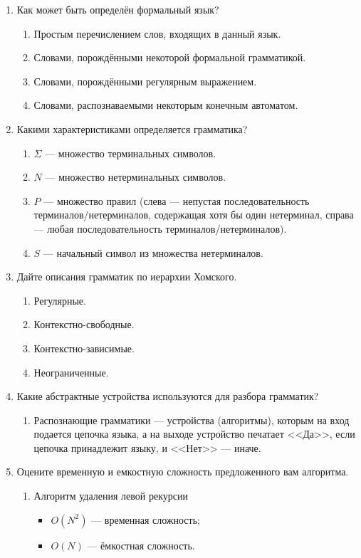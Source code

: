 \begin{enumerate}
  \item Как может быть определён формальный язык?
  \begin{enumerate}
    \item Простым перечислением слов, входящих в данный язык.
    \item Словами, порождёнными некоторой формальной грамматикой.
    \item Словами, порождёнными регулярным выражением.
    \item Словами, распознаваемыми некоторым конечным автоматом.
  \end{enumerate}
  \item Какими характеристиками определяется грамматика?
  \begin{enumerate}
    \item $\Sigma$ --- множество терминальных символов.
    \item $N$ --- множество нетерминальных символов.
    \item $P$ --- множество правил (слева --- непустая последовательность терминалов/нетерминалов, содержащая хотя бы один нетерминал, справа --- любая последовательность терминалов/нетерминалов).
    \item $S$ --- начальный символ из множества нетерминалов.
  \end{enumerate}
  \item Дайте описания грамматик по иерархии Хомского.
  \begin{enumerate}
    \item Регулярные.
    \item Контекстно-свободные.
    \item Контекстно-зависимые.
    \item Неограниченные.
  \end{enumerate}
  \item Какие абстрактные устройства используются для разбора грамматик?
  \begin{enumerate}
    \item Распознающие грамматики --- устройства (алгоритмы), которым на вход подается цепочка языка, а на выходе устройство печатает <<Да>>, если цепочка принадлежит языку, и <<Нет>> --- иначе.
  \end{enumerate}
  \item Оцените временную и емкостную сложность предложенного вам алгоритма.
  \begin{enumerate}
    \item Алгоритм удаления левой рекурсии
    \begin{itemize}
      \item $O(N^2)$ --- временная сложность;
      \item $O(N)$ --- ёмкостная сложность.
    \end{itemize}
  \end{enumerate}
\end{enumerate}


